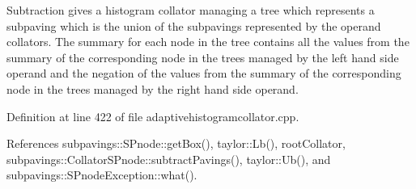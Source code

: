 \-Subtraction gives a histogram collator managing a tree which represents a subpaving which is the union of the subpavings represented by the operand collators. \-The summary for each node in the tree contains all the values from the summary of the corresponding node in the trees managed by the left hand side operand and the negation of the values from the summary of the corresponding node in the trees managed by the right hand side operand. 

\-Definition at line 422 of file adaptivehistogramcollator.\-cpp.



\-References subpavings\-::\-S\-Pnode\-::get\-Box(), taylor\-::\-Lb(), root\-Collator, subpavings\-::\-Collator\-S\-Pnode\-::subtract\-Pavings(), taylor\-::\-Ub(), and subpavings\-::\-S\-Pnode\-Exception\-::what().



